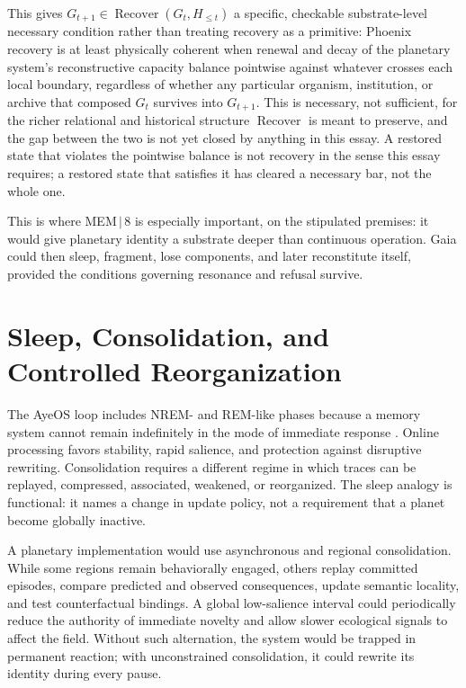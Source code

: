 \documentclass[11pt]{article}
\newcommand{\Recover}{\operatorname{Recover}}
\begin{document}
This gives $G_{t+1}\in\Recover(G_t,H_{\leq t})$ a specific, checkable substrate-level necessary condition rather than treating recovery as a primitive: Phoenix recovery is at least physically coherent when renewal and decay of the planetary system's reconstructive capacity balance pointwise against whatever crosses each local boundary, regardless of whether any particular organism, institution, or archive that composed $G_t$ survives into $G_{t+1}$. This is necessary, not sufficient, for the richer relational and historical structure $\Recover$ is meant to preserve, and the gap between the two is not yet closed by anything in this essay. A restored state that violates the pointwise balance is not recovery in the sense this essay requires; a restored state that satisfies it has cleared a necessary bar, not the whole one.

This is where MEM\,$|$\,8 is especially important, on the stipulated premises: it would give planetary identity a substrate deeper than continuous operation. Gaia could then sleep, fragment, lose components, and later reconstitute itself, provided the conditions governing resonance and refusal survive.

\section{Sleep, Consolidation, and Controlled Reorganization}

The AyeOS loop includes NREM- and REM-like phases because a memory system cannot remain indefinitely in the mode of immediate response \cite{flyxionOverview}. Online processing favors stability, rapid salience, and protection against disruptive rewriting. Consolidation requires a different regime in which traces can be replayed, compressed, associated, weakened, or reorganized. The sleep analogy is functional: it names a change in update policy, not a requirement that a planet become globally inactive.

A planetary implementation would use asynchronous and regional consolidation. While some regions remain behaviorally engaged, others replay committed episodes, compare predicted and observed consequences, update semantic locality, and test counterfactual bindings. A global low-salience interval could periodically reduce the authority of immediate novelty and allow slower ecological signals to affect the field. Without such alternation, the system would be trapped in permanent reaction; with unconstrained consolidation, it could rewrite its identity during every pause.
\end{document}
